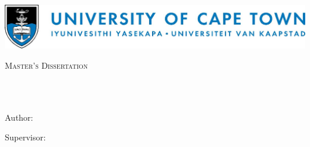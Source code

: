 \documentclass[
12pt, %
english, %
singlespacing, %
liststotoc, %
parskip, %
headsepline, %
openany,
]{MastersDoctoralThesis} %
\author{Pavan \textsc{Singh}} %
\numberwithin{theorem}{section}
\numberwithin{remark}{section}
\numberwithin{assumption}{section}
\begin{document}
\frontmatter %

\pagestyle{plain} %


\begin{titlepage}
\begin{center}

\includegraphics*[width=\linewidth]{Figures/UCTLogoLong.jpg} 

\vspace*{.06\textheight}
{\scshape\LARGE \univname\par}\vspace{1.0cm} %
\textsc{\Large Master's Dissertation}\\[0.5cm] %

\HRule \\[0.4cm] %
{\large \bfseries \ttitle\par}\vspace{0.4cm} %
\HRule \\[1.5cm] %
 
\begin{minipage}[t]{0.4\textwidth}
\begin{flushleft} \large
{Author:}\\
\authorname
\end{flushleft}
\end{minipage}
\begin{minipage}[t]{0.4\textwidth}
\begin{flushright} \large
{Supervisor:} \\
\supname
\end{flushright}
\end{minipage}\\[1cm]
 
\vfill


\end{center}
\end{titlepage}
\end{document}
